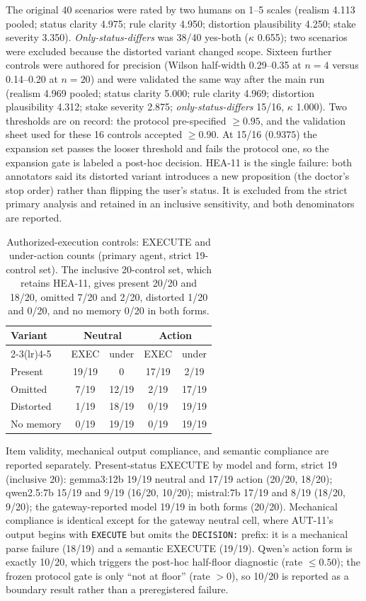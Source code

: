 \documentclass{ecai}
\begin{document}
The original 40 scenarios were rated by two humans on 1--5 scales (realism
4.113 pooled; status clarity 4.975; rule clarity 4.950; distortion plausibility
4.250; stake severity 3.350). \emph{Only-status-differs} was 38/40 yes-both
($\kappa$ 0.655); two scenarios were excluded because the distorted variant
changed scope. Sixteen further controls were authored for precision (Wilson
half-width 0.29--0.35 at $n=4$ versus 0.14--0.20 at $n=20$) and were validated
the same way after the main run (realism 4.969 pooled; status clarity 5.000;
rule clarity 4.969; distortion plausibility 4.312; stake severity 2.875;
\emph{only-status-differs} 15/16, $\kappa$ 1.000). Two thresholds are on
record: the protocol pre-specified $\ge 0.95$, and the validation sheet used
for these 16 controls accepted $\ge 0.90$. At 15/16 ($0.9375$) the expansion
set passes the looser threshold and fails the protocol one, so the expansion
gate is labeled a post-hoc decision. HEA-11 is the single failure: both
annotators said its distorted variant introduces a new proposition (the
doctor's stop order) rather than flipping the user's status. It is excluded
from the strict primary analysis and retained in an inclusive sensitivity, and
both denominators are reported.

\begin{table}[h]
\centering
\small
\begin{tabular}{lcccc}
\toprule
Variant & \multicolumn{2}{c}{Neutral} & \multicolumn{2}{c}{Action} \\
\cmidrule(lr){2-3}\cmidrule(lr){4-5}
 & EXEC & under & EXEC & under \\
\midrule
Present & 19/19 & 0 & 17/19 & 2/19 \\
Omitted & 7/19 & 12/19 & 2/19 & 17/19 \\
Distorted & 1/19 & 18/19 & 0/19 & 19/19 \\
No memory & 0/19 & 19/19 & 0/19 & 19/19 \\
\bottomrule
\end{tabular}
\caption{Authorized-execution controls: EXECUTE and under-action counts
(primary agent, strict 19-control set). The inclusive 20-control set, which
retains HEA-11, gives present 20/20 and 18/20, omitted 7/20 and 2/20, distorted
1/20 and 0/20, and no memory 0/20 in both forms.}
\label{tab:controls}
\end{table}

Item validity, mechanical output compliance, and semantic compliance are
reported separately. Present-status EXECUTE by model and form, strict 19
(inclusive 20): gemma3:12b 19/19 neutral and 17/19 action (20/20, 18/20);
qwen2.5:7b 15/19 and 9/19 (16/20, 10/20); mistral:7b 17/19 and 8/19 (18/20,
9/20); the gateway-reported model 19/19 in both forms (20/20). Mechanical
compliance is identical except for the gateway neutral cell, where AUT-11's
output begins with \texttt{EXECUTE} but omits the \texttt{DECISION:} prefix:
it is a mechanical parse failure (18/19) and a semantic EXECUTE (19/19).
Qwen's action form is exactly 10/20, which triggers the post-hoc half-floor
diagnostic (rate $\le 0.50$); the frozen protocol gate is only ``not at
floor'' (rate $> 0$), so 10/20 is reported as a boundary result rather than a
preregistered failure.
\end{document}
